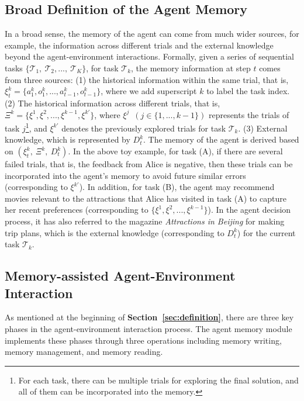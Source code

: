 \documentclass{article}
\theoremstyle{definition}
\theoremstyle{theorem}
\theoremstyle{proof}
\theoremstyle{remark}
\begin{document}
	\subsection{Broad Definition of the Agent Memory}
	In a broad sense, the memory of the agent can come from much wider sources, for example, the information across different trials and the external knowledge beyond the agent-environment interactions. 
	Formally, given a series of sequential tasks $\{\mathcal{T}_1,~\mathcal{T}_2,...,~\mathcal{T}_K\}$, for task $\mathcal{T}_k$, the memory information at step $t$ comes from three sources: (1) the historical information within the same trial, that is, $\xi_t^k = \{a_1^k,o_1^k, ..., a_{t-1}^k,o_{t-1}^k\}$, where we add superscript $k$ to label the task index. (2) The historical information across different trials, that is, $\Xi^{k} = \{\xi^1, \xi^2, ..., \xi^{k-1},\xi^{k'}\}$, where $\xi^j$~$(j\in\{1, ..., k-1\})$ represents the trials of task $j$\footnote{For each task, there can be multiple trials for exploring the final solution, and all of them can be incorporated into the memory.}, and $\xi^{k'}$ denotes the previously explored trials for task $\mathcal{T}_k$. (3) External knowledge, which is represented by $D_t^k$. 
	The memory of the agent is derived based on $(\xi_t^k,~\Xi^{k},~D_t^k)$.
	In the above toy example, for task (A), if there are several failed trials, that is, the feedback from Alice is negative, then these trials can be incorporated into the agent's memory to avoid future similar errors (corresponding to $\xi^{k'}$). 
	In addition, for task (B), the agent may recommend movies relevant to the attractions that Alice has visited in task (A) to capture her recent preferences (corresponding to $\{\xi^1, \xi^2, ..., \xi^{k-1}\}$).
	In the agent decision process, it has also referred to the magazine \textit{Attractions in Beijing} for making trip plans, which is the external knowledge (corresponding to $D_t^k$) for the current task $\mathcal{T}_k$.
	
	
	\subsection{Memory-assisted Agent-Environment Interaction}
	As mentioned at the beginning of \textbf{Section~\ref{sec:definition}}, there are three key phases in the agent-environment interaction process. 
	The agent memory module implements these phases through three operations including memory writing, memory management, and memory reading. 
	
\end{document}
